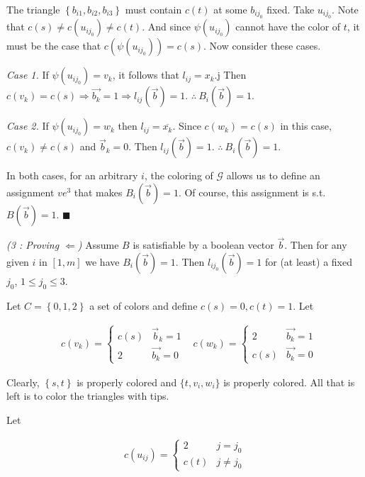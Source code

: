 \documentclass[a4paper]{article}
\begin{document}
The triangle $\left\{ b_{i 1}, b_{i 2}, b_{i 3} \right\} $ must contain $c(t)$
at some $b_{ij_0}$ fixed. Take $u_{ij_0}$. Note that $c(s) \neq c(u_{ij_0})
\neq c(t)$. And since $\psi(u_{ij_0})$ cannot have the color of $t$, it must be
the case that $c \left( \psi\left( u_{ij_0} \right)  \right) = c(s) $. Now consider 
these cases. 

\textit{Case 1.} If $\psi(u_{ij_0}) = v_k$, it follows that $l_{ij} = x_k$.j
Then $c(v_k) = c(s) \Rightarrow \overrightarrow{b_k} = 1 \Rightarrow l_{ij}(\overrightarrow{b}) = 1 $. $\therefore ~ B_i (\overrightarrow{b}) = 1$.

\textit{Case 2.} If $\psi(u_{ij_0}) = w_k$ then $l_{ij} = \overline{x_k}$. Since 
$c(w_k) = c(s)$ in this case, $c(v_k) \neq c(s)$ and $\overrightarrow{b}_k = 0$.
Then $l_{ij}(\overrightarrow{b}) = 1$. $\therefore  ~ B_i(\overrightarrow{b}) = 1$. 

In both cases, for an arbitrary $i$, the coloring of $\mathcal{G}$ allows us 
to define an assignment $ve^3$ that makes $B_i(\overrightarrow{b}) = 1$.
Of course, this assignment is s.t. $B(\overrightarrow{b}) = 1$. $\blacksquare$


\pagebreak


\textit{(3 : Proving $\Leftarrow$)} Assume $B$ is satisfiable by a boolean
vector $\overrightarrow{b}$. Then for any given $i$ in $[1, m]$ we have
$B_i(\overrightarrow{b}) = 1$. Then $l_{ij_{0}}(\overrightarrow{b}) = 1$ for
(at least) a fixed $j_0$, $1 \leq j_0 \leq 3$. 

Let $C = \left\{ 0, 1, 2 \right\} $ a set of colors and define $c(s) = 0, c(t) = 1$. Let 

\begin{align*}
    &c(v_k) = \begin{cases}
        c(s) & \overrightarrow{b}_k = 1 \\ 
        2    & \overrightarrow{b_k} = 0
    \end{cases} & c(w_k) = \begin{cases}
    2 &\overrightarrow{b_k} = 1 \\ 
    c(s) &\overrightarrow{b_k} = 0
    \end{cases}
\end{align*}

Clearly, $\left\{ s, t \right\} $ is properly colored and $\{t, v_i, w_i\}$ is 
properly colored. All that is left is to color the triangles 
with tips.

Let 

\begin{align*}
    c(u_{ij}) = \begin{cases}
        2 & j = j_0 \\ 
        c(t) & j \neq j_0
    \end{cases}
\end{align*}
\end{document}
